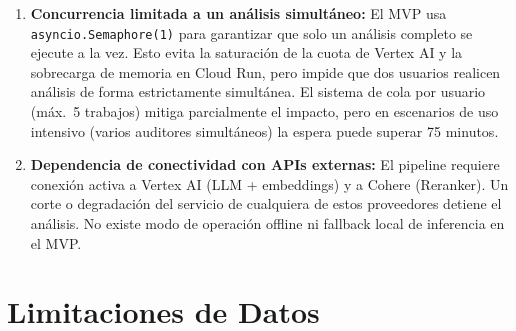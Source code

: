 \begin{enumerate}
    \item \textbf{Concurrencia limitada a un análisis simultáneo:}
    El MVP usa \texttt{asyncio.Semaphore(1)} para garantizar que solo
    un análisis completo se ejecute a la vez. Esto evita la saturación
    de la cuota de Vertex AI y la sobrecarga de memoria en Cloud Run,
    pero impide que dos usuarios realicen análisis de forma estrictamente
    simultánea. El sistema de cola por usuario (máx.\ 5 trabajos)
    mitiga parcialmente el impacto, pero en escenarios de uso intensivo
    (varios auditores simultáneos) la espera puede superar 75 minutos.

    \item \textbf{Dependencia de conectividad con APIs externas:}
    El pipeline requiere conexión activa a Vertex AI (LLM + embeddings)
    y a Cohere (Reranker). Un corte o degradación del servicio de
    cualquiera de estos proveedores detiene el análisis. No existe modo
    de operación offline ni fallback local de inferencia en el MVP.

\end{enumerate}

\section*{Limitaciones de Datos}

